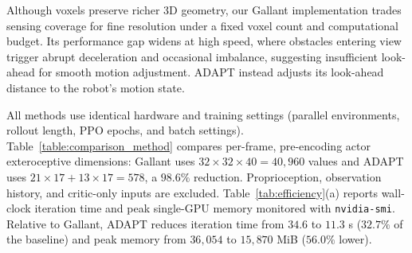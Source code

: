 \documentclass[letterpaper, 10 pt, conference]{ieeeconf/ieeeconf}
\providecommand{\DIFadd}[1]{{\protect\color{blue} \sf #1}} %
\providecommand{\DIFdelbegin}{} %
\providecommand{\DIFaddFL}[1]{\DIFadd{#1}} %
\providecommand{\DIFaddbeginFL}{} %
\providecommand{\DIFdelendFL}{} %
\begin{document}
\DIFdelbegin %
\DIFdelendFL \DIFaddbeginFL \DIFaddFL{Although voxels preserve richer 3D geometry, our Gallant implementation trades sensing coverage for fine resolution under a fixed voxel count and computational budget. Its performance gap widens at high speed, where obstacles entering view trigger abrupt deceleration and occasional imbalance, suggesting insufficient look-ahead for smooth motion adjustment. ADAPT instead adjusts its look-ahead distance to the robot's motion state.
}

\DIFaddFL{All methods use identical hardware and training settings (parallel environments, rollout length, PPO epochs, and batch settings). Table~\ref{table:comparison_method} compares per-frame, pre-encoding actor exteroceptive dimensions: Gallant uses $32\times32\times40=40{,}960$ values and ADAPT uses $21\times17+13\times17=578$, a $98.6\%$ reduction. Proprioception, observation history, and critic-only inputs are excluded.
Table~\ref{tab:efficiency}(a) reports wall-clock iteration time and peak single-GPU memory monitored with \texttt{nvidia-smi}. Relative to Gallant, ADAPT reduces iteration time from $34.6$ to $11.3$ s ($32.7\%$ of the baseline) and peak memory from $36{,}054$ to $15{,}870$ MiB ($56.0\%$ lower).
}
\end{document}
